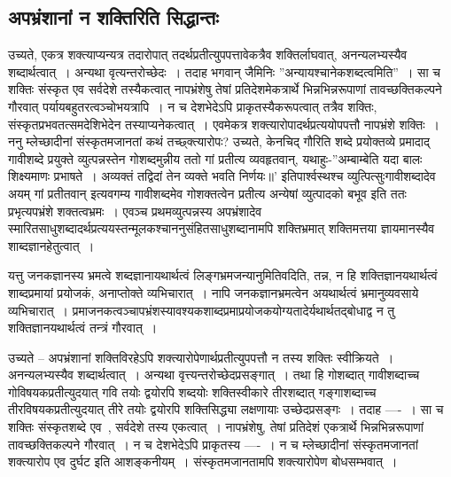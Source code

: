 		\subsection{अपभ्रंशानां न शक्तिरिति सिद्धान्तः}

			\begin{small}

				उच्यते, एकत्र शक्त्याप्यन्यत्र तदारोपात् तदर्थप्रतीत्युपपत्तावेकत्रैव शक्तिर्लाघवात्, अनन्यलभ्यस्यैव शब्दार्थत्वात्~। अन्यथा वृत्यन्तरोच्छेदः~। तदाह भगवान् जैमिनिः  ”अन्यायश्चानेकशब्दत्वमिति”~। सा च शक्तिः संस्कृत एव सर्वदेशे तस्यैकत्वात् नापभ्रंशेषु तेषां प्रतिदेशमेकत्रार्थे भिन्नभिन्नरूपाणां तावच्छक्तिकल्पने गौरवात् पर्यायबहुतरत्वञ्चोभयत्रापि~। न च देशभेदेऽपि प्राकृतस्यैकरूपत्वात् तत्रैव शक्तिः, संस्कृतप्रभवतत्समदेशिभेदेन तस्याप्यनेकत्वात्~। एवमेकत्र शक्त्यारोपादर्थप्रत्ययोपपत्तौ नापभ्रंशे शक्तिः~। ननु म्लेच्छादीनां संस्कृतमजानतां कथं तच्छ्क्त्यारोपः? उच्यते, केनचिद् गौरिति  शब्दे प्रयोक्तव्ये प्रमादाद् गावीशब्दे प्रयुक्ते व्युत्पन्नस्तेन गोशब्दमुन्नीय ततो गां प्रतीत्य व्यवहृतवान्, यथाहुः-”अम्बाम्बेति यदा बालः शिक्ष्यमाणः प्रभाषते~। अव्यक्तं तद्विदां तेन व्यक्ते भवति निर्णयः॥’ इतिपार्श्वस्थश्च व्युत्पित्सुःगावीशब्दादेव अयम् गां प्रतीतवान् इत्यवगम्य गावीशब्दमेव  गोशक्तत्वेन प्रतीत्य  अन्येषां व्युत्पादको  बभूव इति ततः प्रभृत्यपभ्रंशे शक्तत्वभ्रमः~। एवञ्च प्रथमव्युत्पन्नस्य अपभ्रंशादेव  स्मारितसाधुशब्दादर्थप्रत्ययस्तन्मूलकश्चाननुसंहितसाधुशब्दानामपि शक्तिभ्रमात् शक्तिमत्तया ज्ञायमानस्यैव शाब्दज्ञानहेतुत्वात्~। 
				
				यत्तु जनकज्ञानस्य  भ्रमत्वे  शब्दज्ञानायथार्थत्वं लिङ्गभ्रमजन्यानुमितिवदिति,  तन्न, न हि शक्तिज्ञानयथार्थत्वं   शाब्दप्रमायां प्रयोजकं, अनाप्तोक्ते  व्यभिचारात्~। नापि जनकज्ञानभ्रमत्वेन अयथार्थत्वं  भ्रमानुव्यवसाये  व्यभिचारात्~। प्रमाजनकत्वञ्चापभ्रंशस्यावश्यकशाब्दप्रमाप्रयोजकयोग्यतादेर्यथार्थतद्बोधाद्व  न तु शक्तिज्ञानयथार्थत्वं तन्त्रं  गौरवात्~। 
			\end{small}

			उच्यते – अपभ्रंशानां शक्तिविरहेऽपि शक्त्यारोपेणार्थप्रतीत्युपपत्तौ न तस्य शक्तिः स्वीक्रियते~। अनन्यलभ्यस्यैव शब्दार्थत्वात्~। अन्यथा वृत्त्यन्तरोच्छेदप्रसङ्गात्~। तथा हि गोशब्दात् गावीशब्दाच्च गोविषयकप्रतीत्युदयात् गवि तयोः द्वयोरपि शब्दयोः शक्तिस्वीकारे तीरशब्दात् गङ्गाशब्दाच्च तीरविषयकप्रतीत्युदयात् तीरे तयोः द्वयोरपि शक्तिसिद्ध्या लक्षणायाः उच्छेदप्रसङ्गः~। तदाह ----~। सा च शक्तिः संस्कृतशब्दे एव~, सर्वदेशे तस्य एकत्वात्~। नापभ्रंशेषु, तेषां प्रतिदेशं एकत्रार्थे भिन्नभिन्नरूपाणां तावच्छक्तिकल्पने गौरवात्~। न च देशभेदेऽपि प्राकृतस्य ----~। न च म्लेच्छादीनां संस्कृतमजानतां शक्त्यारोप एव दुर्घट इति आशङ्कनीयम्~। संस्कृतमजानतामपि शक्त्यारोपेण बोधसम्भवात्~।  

